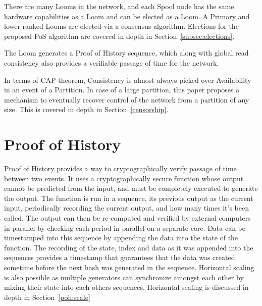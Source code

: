 \documentclass[12pt]{article}
\begin{document}
There are many Looms in the network, and each Spool node has the same hardware capabilities as a Loom and can be elected as a Loom.  A Primary and lower ranked Looms are elected via a consensus algorithm. Elections for the proposed PoS algorithm are covered in depth in Section~\ref{subsec:elections}.

The Loom generates a Proof of History sequence, which along with global read consistency also provides a verifiable passage of time for the network.

In terms of CAP theorem, Consistency is almost always picked over Availability in an event of a Partition. In case of a large partition, this paper proposes a mechanism to eventually recover control of the network from a partition of any size.  This is covered in depth in Section~\ref{censorship}.

\section{Proof of History}\label{proof_of_history}

Proof of History provides a way to cryptographically verify passage of time between two events. It uses a cryptographically secure function whose output cannot be predicted from the input, and must be completely executed to generate the output. The function is run in a sequence, its previous output as the current input, periodically recording the current output, and how many times it's been called. The output can then be re-computed and verified by external computers in parallel by checking each period in parallel on a separate core. Data can be timestamped into this sequence by appending the data into the state of the function.  The recording of the state, index and data as it was appended into the sequences provides a timestamp that guarantees that the data was created sometime before the next hash was generated in the sequence. Horizontal scaling is also possible as multiple generators can synchronize amongst each other by mixing their state into each others sequences.  Horizontal scaling is discussed in depth in Section~\ref{poh:scale}\\
\end{document}
